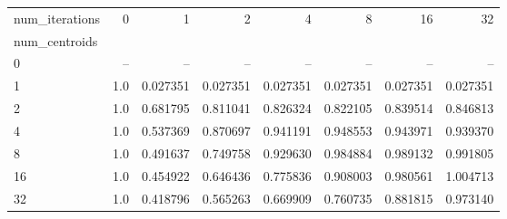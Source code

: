 \begin{tabular}{lrrrrrrr}
\toprule
num\_iterations &   0  &        1  &        2  &        4  &        8  &        16 &        32 \\
num\_centroids &      &           &           &           &           &           &           \\
\midrule
0             &  -- &       -- &       -- &       -- &       -- &       -- &       -- \\
1             &  1.0 &  0.027351 &  0.027351 &  0.027351 &  0.027351 &  0.027351 &  0.027351 \\
2             &  1.0 &  0.681795 &  0.811041 &  0.826324 &  0.822105 &  0.839514 &  0.846813 \\
4             &  1.0 &  0.537369 &  0.870697 &  0.941191 &  0.948553 &  0.943971 &  0.939370 \\
8             &  1.0 &  0.491637 &  0.749758 &  0.929630 &  0.984884 &  0.989132 &  0.991805 \\
16            &  1.0 &  0.454922 &  0.646436 &  0.775836 &  0.908003 &  0.980561 &  1.004713 \\
32            &  1.0 &  0.418796 &  0.565263 &  0.669909 &  0.760735 &  0.881815 &  0.973140 \\
\bottomrule
\end{tabular}
